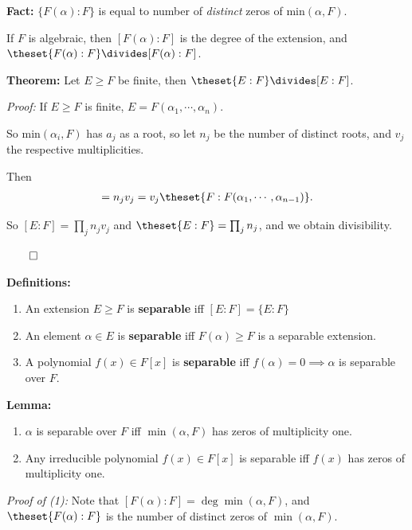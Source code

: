 \textbf{Fact:} \(\{F(\alpha): F \}\) is equal to number of
\emph{distinct} zeros of \(\mathrm{min}(\alpha, F)\).

If \(F\) is algebraic, then \([F(\alpha): F]\) is the degree of the
extension, and \(\theset{F(\alpha): F} \divides [F(\alpha): F]\).

\textbf{Theorem:} Let \(E \geq F\) be finite, then
\(\theset{E: F} \divides [E:F]\).

\emph{Proof:} If \(E \geq F\) is finite,
\(E = F(\alpha_1, \cdots, \alpha_n)\).

So \(\mathrm{min}(\alpha_i, F)\) has \(a_j\) as a root, so let \(n_j\)
be the number of distinct roots, and \(v_j\) the respective
multiplicities.

Then
\begin{align*}
[F: F(\alpha_1, \cdots, \alpha_{n-1})] = n_j v_j = v_j \theset{F: F(\alpha_1, \cdots, \alpha_{n-1})}
.\end{align*}

So \([E: F] = \prod_j n_j v_j\) and \(\theset{E:F} = \prod_j n_j\), and
we obtain divisibility.

\(\qed\)

\textbf{Definitions:}

\begin{enumerate}
\def\labelenumi{\arabic{enumi}.}
\item
  An extension \(E \geq F\) is \textbf{separable} iff
  \([E:F] = \{E: F\}\)
\item
  An element \(\alpha \in E\) is \textbf{separable} iff
  \(F(\alpha) \geq F\) is a separable extension.
\item
  A polynomial \(f(x) \in F[x]\) is \textbf{separable} iff
  \(f(\alpha) = 0 \implies \alpha\) is separable over \(F\).
\end{enumerate}

\textbf{Lemma:}

\begin{enumerate}
\def\labelenumi{\arabic{enumi}.}
\item
  \(\alpha\) is separable over \(F\) iff \(\min(\alpha, F)\) has zeros
  of multiplicity one.
\item
  Any irreducible polynomial \(f(x) \in F[x]\) is separable iff \(f(x)\)
  has zeros of multiplicity one.
\end{enumerate}

\emph{Proof of (1):} Note that
\([F(\alpha): F] = \deg \min(\alpha, F)\), and \(\theset{F(\alpha): F}\)
is the number of distinct zeros of \(\min(\alpha, F)\).

